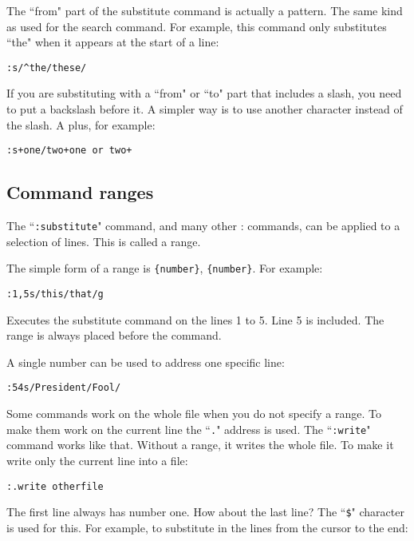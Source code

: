 The ``from" part of the substitute command is actually a pattern.
The same kind as used for the search command.
For example, this command only substitutes ``the" when it appears at the start of a line:

\begin{Verbatim}[samepage=true]
 :s/^the/these/
\end{Verbatim}

If you are substituting with a ``from" or ``to" part that includes a slash, you need to put a backslash before it.
A simpler way is to use another character instead of the slash.
A plus, for example:

\begin{Verbatim}[samepage=true]
 :s+one/two+one or two+
\end{Verbatim}
\subsection{Command ranges}
\label{Command ranges}
The ``\texttt{:substitute}" command, and many other : commands, can be applied to a selection of lines.
This is called a range.

The simple form of a range is \texttt{\{number\}}, \texttt{\{number\}}.
For example:

\begin{Verbatim}[samepage=true]
 :1,5s/this/that/g
\end{Verbatim}

Executes the substitute command on the lines 1 to 5.
Line 5 is included.
The range is always placed before the command.

A single number can be used to address one specific line:

\begin{Verbatim}[samepage=true]
 :54s/President/Fool/
\end{Verbatim}

Some commands work on the whole file when you do not specify a range.
To make them work on the current line the ``\texttt{.}" address is used.
The ``\texttt{:write}" command works like that.
Without a range, it writes the whole file.
To make it write only the current line into a file:

\begin{Verbatim}[samepage=true]
 :.write otherfile
\end{Verbatim}

The first line always has number one.
How about the last line?
The ``\texttt{\$}" character is used for this.
For example, to substitute in the lines from the cursor to the end:


